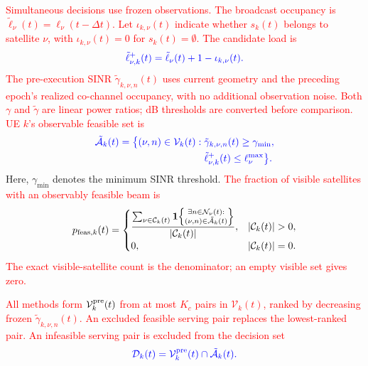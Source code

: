 \documentclass[10pt,letterpaper,journal]{IEEEtran}
\newcommand{\revnew}[1]{\textcolor{red}{#1}}
\begin{document}
\revnew{Simultaneous decisions use frozen observations.}
\revnew{The broadcast occupancy is $\tilde{\ell}_\nu(t)=\ell_\nu(t-\Delta t)$. Let $\iota_{k,\nu}(t)$ indicate whether $s_k(t)$ belongs to satellite $\nu$, with $\iota_{k,\nu}(t)=0$ for $s_k(t)=\emptyset$. The candidate load is}
\begin{equation}
\textcolor{blue}{
\tilde{\ell}_{\nu,k}^{+}(t)
=
\tilde{\ell}_\nu(t)+1-\iota_{k,\nu}(t).}    
\end{equation}
\revnew{The pre-execution SINR $\tilde{\gamma}_{k,\nu,n}(t)$ uses current geometry and the preceding epoch's realized co-channel occupancy, with no additional observation noise. Both $\gamma$ and $\tilde\gamma$ are linear power ratios; dB thresholds are converted before comparison. UE $k$'s observable feasible set is}
\begin{equation}
\textcolor{blue}{
\begin{aligned}
\tilde{\mathcal A}_k(t)=\bigl\{(\nu,n)\in\mathcal V_k(t):\;&
\tilde\gamma_{k,\nu,n}(t)\ge\gamma_{\min},\\
&\tilde\ell_{\nu,k}^{+}(t)\le\ell_\nu^{\max}\bigr\}.
\end{aligned}
}
\label{eq:observable_feasible_set}
\end{equation}
Here, $\gamma_{\min}$ denotes the minimum SINR threshold.
\revnew{The fraction of visible satellites with an observably feasible beam is}
\begin{equation}
p_{{\rm feas},k}(t)=
\begin{cases}
\displaystyle
\frac{\sum_{\nu\in\mathcal C_k(t)}
\mathbf 1\!\left\{\substack{\exists n\in\mathcal N_\nu(t):\\
(\nu,n)\in\tilde{\mathcal A}_k(t)}\right\}}
{|\mathcal C_k(t)|},
& |\mathcal C_k(t)|>0,\\[4pt]
0,& |\mathcal C_k(t)|=0.
\end{cases}
\label{eq:p_feas}
\end{equation}
\revnew{The exact visible-satellite count is the denominator; an empty visible set gives zero.}

\revnew{All methods form $\mathcal V_k^{\rm pre}(t)$ from at most $K_c$ pairs in $\mathcal V_k(t)$, ranked by decreasing frozen $\tilde\gamma_{k,\nu,n}(t)$. An excluded feasible serving pair replaces the lowest-ranked pair. An infeasible serving pair is excluded from the decision set}
\begin{equation}
\textcolor{blue}{
\mathcal D_k(t) 
=\mathcal V_k^{\rm pre}(t)\cap\tilde{\mathcal A}_k(t).}  
\end{equation}
\end{document}
